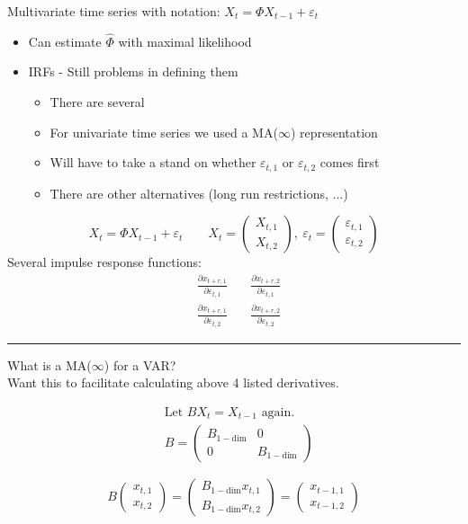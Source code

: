 Multivariate time series with notation: $X_t = \Phi X_{t-1}  +\varepsilon_t$
\begin{itemize}
    \item Can estimate $\hat{\Phi}$ with maximal likelihood
    \item IRFs - Still problems in defining them
    \begin{itemize}
        \item There are several
        \item For univariate time series we used a MA($\infty$) representation
        \item Will have to take a stand on whether $\varepsilon_{t,1}$ or $\varepsilon_{t,2}$ comes first
        \item There are other alternatives (long run restrictions, ...) 
    \end{itemize}
\end{itemize}
\[
X_t = \Phi X_{t-1} + \varepsilon_t \quad \quad X_t = \begin{pmatrix}
    X_{t,1} \\
    X_{t,2}
\end{pmatrix} ,\ \varepsilon_t = \begin{pmatrix}
    \varepsilon_{t,1}\\
    \varepsilon_{t,2}
\end{pmatrix}
\]
Several impulse response functions:
\begin{align*}
    & \frac{\partial x_{t+r, 1}}{\partial \varepsilon_{t, 1}} & \quad \frac{\partial x_{t+r, 2}}{\partial \varepsilon_{t, 1}} \\
    & \frac{\partial x_{t+r, 1}}{\partial \varepsilon_{t, 2}} & \quad \frac{\partial x_{t+r, 2}}{\partial \varepsilon_{t, 2}}
\end{align*}

\noindent
\rule{\linewidth}{0.4pt}
\noindent
What is a MA($\infty$) for a VAR?\\
Want this to facilitate calculating above 4 listed derivatives.

\begin{align*}
    & \text{Let } B X_t = X_{t-1} \text{ again.} \\
    & B = \begin{pmatrix}
    B_{1-\text{dim}} & 0 \\
    0 & B_{1-\text{dim}}
    \end{pmatrix}
\end{align*}

\[
B \begin{pmatrix}
x_{t,1} \\
x_{t,2}
\end{pmatrix}
= \begin{pmatrix}
B_{1-\text{dim}} x_{t,1} \\
B_{1-\text{dim}} x_{t,2}
\end{pmatrix}
= \begin{pmatrix}
x_{t-1,1} \\
x_{t-1,2}
\end{pmatrix}
\]

